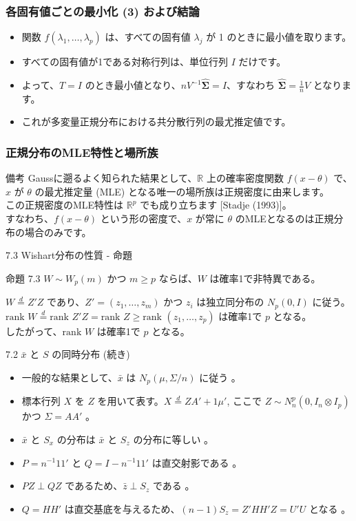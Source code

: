 \documentclass[aspectratio=169]{beamer}
\begin{document}
\begin{frame}
\frametitle{各固有値ごとの最小化 (3) および結論}
\begin{itemize}
    \item 関数 $f(\lambda_1,\dots,\lambda_p)$ は、すべての固有値 $\lambda_j$ が 1 のときに最小値を取ります。
    \item すべての固有値が1である対称行列は、単位行列 $I$ だけです。
    \item よって、$T = I$ のとき最小値となり、$nV^{-1}\hat{\bm{\Sigma}} = I$、すなわち $\hat{\bm{\Sigma}} = \frac{1}{n}V$ となります。
    \item これが多変量正規分布における共分散行列の最尤推定値です。
\end{itemize}
\end{frame}

\begin{frame}
\frametitle{正規分布のMLE特性と場所族}
\begin{block}{備考}
Gaussに遡るよく知られた結果として、$\mathbb{R}$ 上の確率密度関数 $f(x-\theta)$ で、$x$ が $\theta$ の最尤推定量 (MLE) となる唯一の場所族は正規密度に由来します。\\
この正規密度のMLE特性は $\mathbb{R}^p$ でも成り立ちます [Stadje (1993)]。\\
すなわち、$f(x-\theta)$ という形の密度で、$x$ が常に $\theta$ のMLEとなるのは正規分布の場合のみです。
\end{block}
\end{frame}

\begin{frame}{7.3 Wishart分布の性質 - 命題}
\begin{block}{命題 7.3}
$W \sim W_p(m)$ かつ $m \ge p$ ならば、$W$ は確率1で非特異である。
\end{block}

$W \overset{d}{=} Z'Z$ であり、$Z' = (z_1, \dots, z_m)$ かつ $z_i$ は独立同分布の $N_p(0, I)$ に従う。\\
$\text{rank } W \overset{d}{=} \text{rank } Z'Z = \text{rank } Z \ge \text{rank } (z_1, \dots, z_p)$ は確率1で $p$ となる。\\
したがって、$\text{rank } W$ は確率1で $p$ となる。
\end{frame}


\begin{frame}{7.2 $\bar{x}$ と $S$ の同時分布 (続き)}
\begin{itemize}
    \item 一般的な結果として、$\bar{x}$ は $N_p(\mu, \Sigma/n)$ に従う 。
    \item 標本行列 $X$ を $Z$ を用いて表す。$X \overset{d}{=} ZA' + 1\mu'$, ここで $Z \sim N_n^p(0, I_n \otimes I_p)$ かつ $\Sigma=AA'$ 。
    \item $\bar{x}$ と $S_x$ の分布は $\bar{x}$ と $S_z$ の分布に等しい 。
    \item $P=n^{-1}11'$ と $Q=I-n^{-1}11'$ は直交射影である 。
    \item $PZ \perp QZ$ であるため、$\bar{z} \perp S_z$ である 。
    \item $Q=HH'$ は直交基底を与えるため、$(n-1)S_z = Z'HH'Z = U'U$ となる 。
\end{itemize}
\end{frame}
\end{document}
